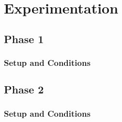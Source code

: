 
\chapter{Experimentation} %

\label{Chapter4} %



\section{Phase 1}


\subsection{Setup and Conditions}



%



\section{Phase 2}


\subsection{Setup and Conditions}




\newpage
